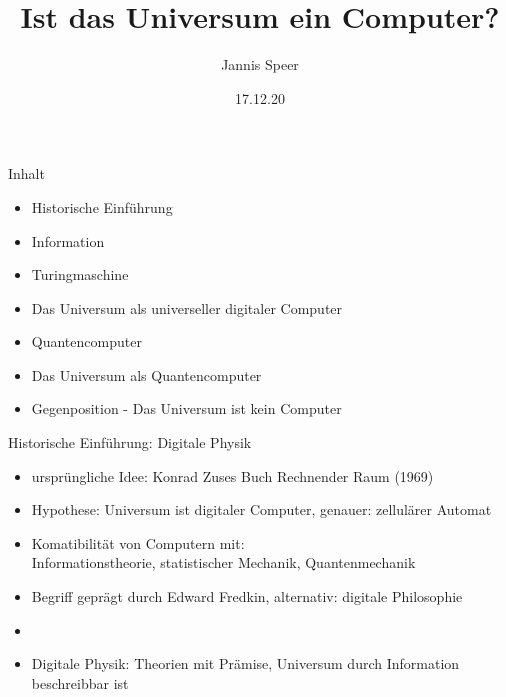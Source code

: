 \documentclass[aspectratio=1610, 9pt]{beamer}
\title{Ist das Universum ein Computer?}
\author[J.~Speer]{Jannis Speer}
\date{17.12.20}
\institute{Big Questions Seminar}
\begin{document}
\maketitle

\begin{frame}{Inhalt}
  \begin{itemize}
    \item Historische Einführung
    \item Information
    \item Turingmaschine
    \item Das Universum als universeller digitaler Computer
    \item Quantencomputer
    \item Das Universum als Quantencomputer
    \item Gegenposition - Das Universum ist kein Computer
  \end{itemize}
\end{frame}


\begin{frame}{Historische Einführung: Digitale Physik}
  \begin{itemize}
    \item ursprüngliche Idee: Konrad Zuses Buch Rechnender Raum (1969)
    \item Hypothese: Universum ist digitaler Computer, genauer: zellulärer Automat
    \item Komatibilität von Computern mit: \\Informationstheorie, statistischer Mechanik, Quantenmechanik
    \item Begriff geprägt durch  Edward Fredkin, alternativ: digitale Philosophie
    \item[]
    \item[\rightarrow] Digitale Physik: Theorien mit Prämise, Universum durch Information beschreibbar ist
  \end{itemize}
\end{frame}
\end{document}
